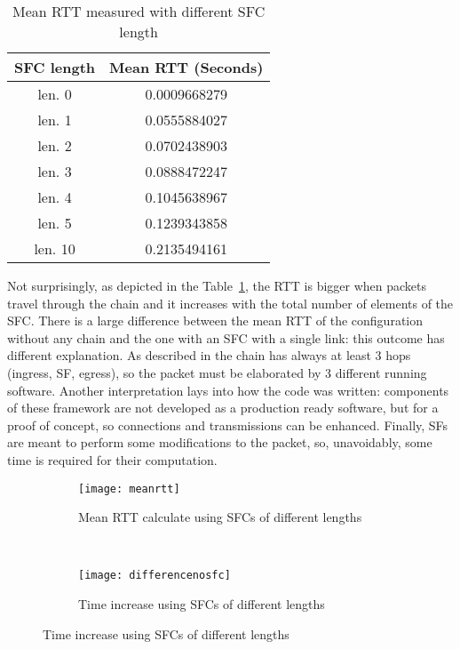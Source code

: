 \begin{table}[H]
\centering
\begin{tabular}{@{}cc@{}}
\toprule
\textbf{SFC length} & \textbf{Mean RTT (Seconds)} \\ \midrule
len. 0              & 0.0009668279      \\
len. 1              & 0.0555884027      \\
len. 2              & 0.0702438903      \\
len. 3              & 0.0888472247      \\
len. 4              & 0.1045638967      \\
len. 5              & 0.1239343858      \\
len. 10             & 0.2135494161      \\ \bottomrule
\end{tabular}
\caption{Mean RTT measured with different SFC length}
\label{chap:tests:sec:rtt:tab:meanrtt}
\end{table}

Not surprisingly, as depicted in the Table~\ref{chap:tests:sec:rtt:tab:meanrtt},
the RTT is bigger when packets travel through the chain and it increases with
the total number of elements of the SFC. There is a large
difference between the mean RTT of the configuration without any chain and the
one with an SFC with a single link: this outcome has different explanation. As
described in  the chain has always at
least 3 hops (ingress, SF, egress), so the packet must be elaborated by 3
different running software. Another interpretation lays into how the code was
written: components of these framework are not developed as a production ready
software, but for a proof of concept, so connections and transmissions can be
enhanced. Finally, SFs are meant to perform some modifications to the packet,
so, unavoidably, some time is required for their computation.

\begin{figure}[H]
    \begin{subfigure}[b]{0.45\textwidth}
        \texttt{[image: meanrtt]}
        \caption{Mean RTT calculate using SFCs of different lengths}
        \label{chap:tests:sec:rtt:img:meanstt}
    \end{subfigure}
    ~
    \begin{subfigure}[b]{0.45\textwidth}
        \texttt{[image: differencenosfc]}
        \caption{Time increase using SFCs of different lengths}
        \label{chap:tests:sec:rtt:img:differencertt}
    \end{subfigure}
\end{figure}

